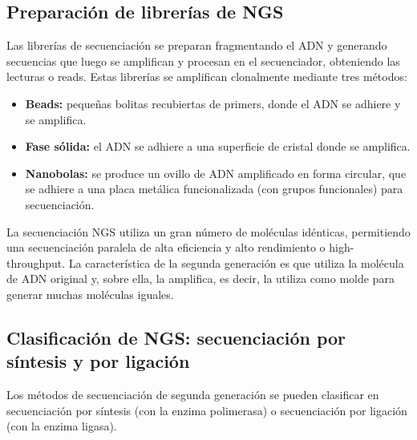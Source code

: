\subsection{Preparación de librerías de NGS}
Las librerías de secuenciación se preparan fragmentando el ADN y generando secuencias que luego se amplifican y procesan en el secuenciador, obteniendo las lecturas o reads. Estas librerías se amplifican clonalmente mediante tres métodos:
\begin{itemize}
\item \textbf{Beads:} pequeñas bolitas recubiertas de primers, donde el ADN se adhiere y se amplifica.
\item \textbf{Fase sólida:} el ADN se adhiere a una superficie de cristal donde se amplifica.
\item \textbf{Nanobolas:} se produce un ovillo de ADN amplificado en forma circular, que se adhiere a una placa metálica funcionalizada (con grupos funcionales) para secuenciación.
\end{itemize}

La secuenciación NGS utiliza un gran número de moléculas idénticas, permitiendo una secuenciación paralela de alta eficiencia y alto rendimiento o high-throughput. La característica de la segunda generación es que utiliza la molécula de ADN original y, sobre ella, la amplifica, es decir, la utiliza como molde para generar muchas moléculas iguales. 

\subsection{Clasificación de NGS: secuenciación por síntesis y por ligación}
Los métodos de secuenciación de segunda generación se pueden clasificar en secuenciación por síntesis (con la enzima polimerasa) o secuenciación por ligación (con la enzima ligasa).

